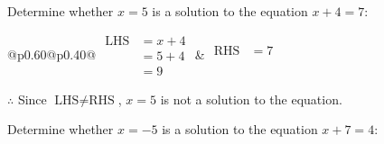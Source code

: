 \documentclass[12pt]{article}
\newcounter{minipagecount}
\begin{document}
\begin{multicols}{2}
\begin{minipage}[t]{0.40\textwidth}
    \noindent Determine whether \(x = 5\) is a solution to the equation \(x + 4 = 7\):
    \vspace{2pt}  %

    \noindent
    \renewcommand{\arraystretch}{1.3} %
    \begin{tabular}{@{}p{0.60\linewidth}@{}p{0.40\linewidth}@{}}
        \(\begin{aligned}
            \text{LHS} &= x + 4 \\
                    &= 5 + 4 \\
                    &= 9 
        \end{aligned}\) &
        \(\begin{aligned}
            \text{RHS} &= 7\\
                    & \\
                    &
        \end{aligned}\)
    \end{tabular}
    \renewcommand{\arraystretch}{1.0} %
    \vspace{2pt}  %

    \noindent \(\therefore\) Since \(\text{LHS} \neq \text{RHS}\), \(x = 5\) is not  a solution to the equation.

\end{minipage}

\vspace*{0.5ex}
\vfill{}
\noindent{(\theminipagecount)}\hspace{0.1mm} %
\begin{minipage}[t]{0.40\textwidth} %

    \noindent Determine whether \(x = -5\) is a solution to the equation \(x + 7 = 4\):
    \vspace{2pt}  %


\end{minipage}
\end{multicols}
\end{document}

